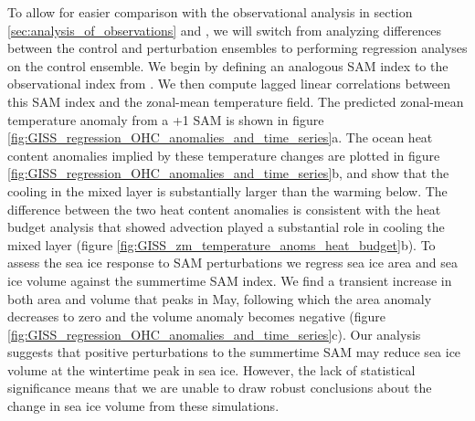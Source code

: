\documentclass{ametsocV5}
\begin{document}



To allow for easier comparison with the observational analysis in section \ref{sec:analysis_of_observations} and \citet{Doddridge2017}, we will switch from analyzing differences between the control and perturbation ensembles to performing regression analyses on the control ensemble. We begin by defining an analogous SAM index to the observational index from \citet{Marshall2003a}. We then compute lagged linear correlations between this SAM index and the zonal-mean temperature field. The predicted zonal-mean temperature anomaly from a +1 SAM is shown in figure \ref{fig:GISS_regression_OHC_anomalies_and_time_series}a. The ocean heat content anomalies implied by these temperature changes are plotted in figure \ref{fig:GISS_regression_OHC_anomalies_and_time_series}b, and show that the cooling in the mixed layer is substantially larger than the warming below. The difference between the two heat content anomalies is consistent with the heat budget analysis that showed advection played a substantial role in cooling the mixed layer (figure \ref{fig:GISS_zm_temperature_anoms_heat_budget}b). To assess the sea ice response to SAM perturbations we regress sea ice area and sea ice volume against the summertime SAM index. We find a transient increase in both area and volume that peaks in May, following which the area anomaly decreases to zero and the volume anomaly becomes negative (figure \ref{fig:GISS_regression_OHC_anomalies_and_time_series}c). Our analysis suggests that positive perturbations to the summertime SAM may reduce sea ice volume at the wintertime peak in sea ice. However, the lack of statistical significance means that we are unable to draw robust conclusions about the change in sea ice volume from these simulations.


\end{document}
